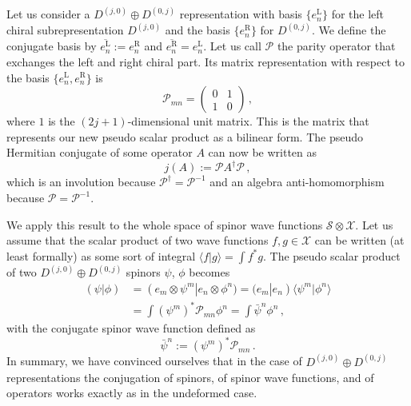 \documentclass[12pt,a4paper]{article}
\newcommand{\Xcal}{\mathcal{X}}
\newcommand{\Scal}{\mathcal{S}}
\newcommand{\lrAngle}[1]{\langle #1\rangle}
\begin{document}
Let us consider a $D^{(j,0)}\oplus D^{(0,j)}$ representation with
basis $\{e^\mathrm{L}_n\}$ for the left chiral subrepresentation
$D^{(j,0)}$ and the basis $\{e^\mathrm{R}_n\}$ for $D^{(0,j)}$. We
define the conjugate basis by $\overline{e^\mathrm{L}_n} :=
e^\mathrm{R}_n$ and $\overline{e^\mathrm{R}_n} = e^\mathrm{L}_n$. Let
us call $\mathcal{P}$ the parity operator that exchanges the left and
right chiral part. Its matrix representation with respect to the
basis $\{e^\mathrm{L}_n , e^\mathrm{R}_n\}$ is
\begin{equation}
\label{eq:Parity}
  \mathcal{P}_{mn}=
  \begin{pmatrix} 0 & 1 \\ 1 & 0 \end{pmatrix}\,,
\end{equation}
where $1$ is the $(2j+1)$-dimensional unit matrix. This is the matrix
that represents our new pseudo scalar product as a bilinear form.  The
pseudo Hermitian conjugate of some operator $A$ can now be written as
\begin{equation}
  j(A) := \mathcal{P}A^\dagger \mathcal{P} \,,
\end{equation}
which is an involution because $\mathcal{P}^\dagger =
\mathcal{P}^{-1}$ and an algebra anti-homomorphism because
$\mathcal{P} = \mathcal{P}^{-1}$.

We apply this result to the whole space of spinor wave functions
$\Scal\otimes \Xcal$. Let us assume that the scalar product of two
wave functions $f,g\in\Xcal$ can be written (at least formally) as
some sort of integral $\lrAngle{f | g } = \int f^* g$.  The pseudo
scalar product of two $D^{(j,0)}\oplus D^{(0,j)}$ spinors $\psi$,
$\phi$ becomes
\begin{equation}
\begin{split}
  (\psi|\phi) &= (e_m\otimes \psi^m|e_n \otimes \phi^n)
  =(e_m|e_n) \lrAngle{ \psi^m|\phi^n} \\
  &= {\textstyle\int} (\psi^m)^* \mathcal{P}_{mn} \phi^n
  = {\textstyle\int} \bar{\psi}^n \phi^n \,,
\end{split}
\end{equation}
with the conjugate spinor wave function defined as
\begin{equation}
\label{eq:Wave3}
  \bar{\psi}^n := (\psi^m)^* \mathcal{P}_{mn} \,.
\end{equation}
In summary, we have convinced ourselves that in the case of
$D^{(j,0)}\oplus D^{(0,j)}$ representations the conjugation of
spinors, of spinor wave functions, and of operators works exactly as
in the undeformed case.
\end{document}

